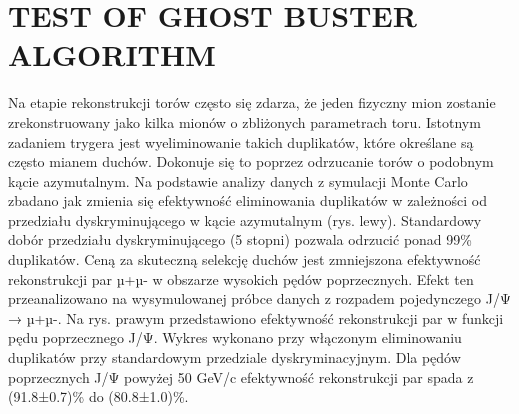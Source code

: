 \section{TEST OF GHOST BUSTER ALGORITHM}

Na etapie rekonstrukcji torów często się zdarza, że jeden fizyczny mion zostanie zrekonstruowany jako kilka mionów o zbliżonych parametrach toru.  Istotnym zadaniem trygera jest wyeliminowanie takich duplikatów, które określane są często mianem duchów. Dokonuje się to poprzez odrzucanie torów o podobnym kącie azymutalnym. Na podstawie analizy danych z symulacji Monte Carlo zbadano jak zmienia się efektywność eliminowania duplikatów w zależności od przedziału dyskryminującego w kącie azymutalnym (rys. lewy). Standardowy dobór przedziału dyskryminującego (5 stopni) pozwala odrzucić ponad 99\% duplikatów. Ceną za skuteczną selekcję duchów jest zmniejszona efektywność rekonstrukcji par µ+µ- w obszarze wysokich pędów poprzecznych. Efekt ten przeanalizowano na wysymulowanej próbce danych z rozpadem pojedynczego J/Ψ → µ+µ-. Na rys. prawym przedstawiono efektywność rekonstrukcji par w funkcji pędu poprzecznego J/Ψ. Wykres wykonano przy włączonym eliminowaniu duplikatów przy standardowym przedziale dyskryminacyjnym. Dla pędów poprzecznych J/Ψ powyżej 50 GeV/c efektywność rekonstrukcji par spada z (91.8±0.7)\% do (80.8±1.0)\%.
